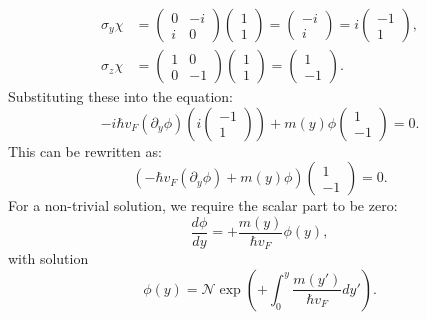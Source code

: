 \documentclass{article}
\begin{document}
	\begin{align*}
		\sigma_y \chi &= \begin{pmatrix} 0 & -i \\ i & 0 \end{pmatrix} \begin{pmatrix} 1 \\ 1 \end{pmatrix} = \begin{pmatrix} -i \\ i \end{pmatrix} = i \begin{pmatrix} -1 \\ 1 \end{pmatrix}, \\
		\sigma_z \chi &= \begin{pmatrix} 1 & 0 \\ 0 & -1 \end{pmatrix} \begin{pmatrix} 1 \\ 1 \end{pmatrix} = \begin{pmatrix} 1 \\ -1 \end{pmatrix}.
	\end{align*}
	Substituting these into the equation:
	\begin{equation}
		-i \hbar v_F (\partial_y \phi) \left(i \begin{pmatrix} -1 \\ 1 \end{pmatrix}\right) + m(y) \phi \begin{pmatrix} 1 \\ -1 \end{pmatrix} = 0.
	\end{equation}
	This can be rewritten as:
	\begin{equation}
		\left( -\hbar v_F (\partial_y \phi) + m(y) \phi \right) \begin{pmatrix} 1 \\ -1 \end{pmatrix} = 0.
	\end{equation}
	For a non-trivial solution, we require the scalar part to be zero:
	\begin{equation}
		\frac{d\phi}{dy} = +\frac{m(y)}{\hbar v_F} \phi(y),
	\end{equation}
	with solution
	\begin{equation} \label{eq:our_edge_state}
		\phi(y) = \mathcal{N} \exp\left(+\int_0^y \frac{m(y')}{\hbar v_F} dy'\right).
	\end{equation}
\end{document}
